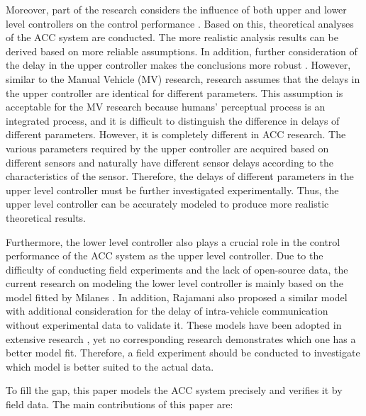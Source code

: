 \documentclass[journal]{IEEEtran}
\begin{document}
Moreover, part of the research considers the influence of both upper and lower level controllers on the control performance \citep{Wang2018a,Zhou2019c}. Based on this, theoretical analyses of the ACC system are conducted. The more realistic analysis results can be derived based on more reliable assumptions. In addition, further consideration of the delay in the upper controller makes the conclusions more robust \citep{Jin2016}. However, similar to the Manual Vehicle (MV) research, research assumes that the delays in the upper controller are identical for different parameters. This assumption is acceptable for the MV research because humans' perceptual process is an integrated process, and it is difficult to distinguish the difference in delays of different parameters. However, it is completely different in ACC research. The various parameters required by the upper controller are acquired based on different sensors and naturally have different sensor delays according to the characteristics of the sensor. Therefore, the delays of different parameters in the upper level controller must be further investigated experimentally. Thus, the upper level controller can be accurately modeled to produce more realistic theoretical results.

Furthermore, the lower level controller also plays a crucial role in the control performance of the ACC system as the upper level controller. Due to the difficulty of conducting field experiments and the lack of open-source data, the current research on modeling the lower level controller is mainly based on the model fitted by Milanes \citep{Milanes2014}. In addition, Rajamani \citep{Rajamani2011} also proposed a similar model with additional consideration for the delay of intra-vehicle communication without experimental data to validate it. These models have been adopted in extensive research \citep{Navas2019,Wang2018a}, yet no corresponding research demonstrates which one has a better model fit. Therefore, a field experiment should be conducted to investigate which model is better suited to the actual data.


To fill the gap, this paper models the ACC system precisely and verifies it by field data. The main contributions of this paper are:
\end{document}

